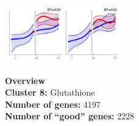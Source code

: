 \begin{multicols}{2}
\includegraphics[width=2in]{figures/clusters/leaf_Postflowering_7.png}
\columnbreak

\noindent \textbf{Overview}\\\textbf{Cluster 8:} Glutathione \\
\textbf{Number of genes:} 4197 \\
\textbf{Number of ``good'' genes:} 2228 \\
\end{multicols}

